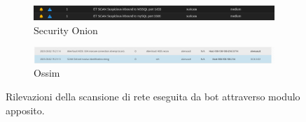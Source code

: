 \begin{figure}[hbtp]
    \centering
    \begin{subfigure}{\textwidth}
        \centering
        \includegraphics[width=\textwidth]{res/fig/byob-result-2.png}
        \caption{Security Onion}
        \label{fig:byob-result-2}
    \end{subfigure}
    \hfill
    \begin{subfigure}{\textwidth}
        \centering
        \includegraphics[width=\textwidth]{res/fig/byob-result-3.png}
        \caption{Ossim}
        \label{fig:byob-result-3}
    \end{subfigure}
    \caption{Rilevazioni della scansione di rete eseguita da bot attraverso modulo apposito.}
    \label{fig:byob-results-2-3}
\end{figure}

